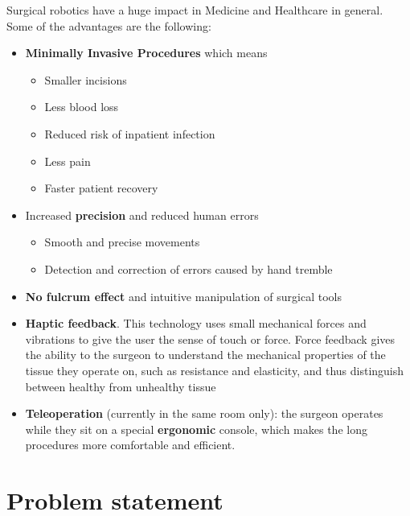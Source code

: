 Surgical robotics have a huge impact in Medicine and Healthcare in general. Some of the advantages are the following:
\begin{itemize}
\item \textbf{Minimally Invasive Procedures} which means
	\begin{itemize}
	\item Smaller incisions
	\item Less blood loss
	\item Reduced risk of inpatient infection
	\item Less pain
	\item Faster patient recovery
	\end{itemize}
\item Increased \textbf{precision} and reduced human errors
	\begin{itemize}
	\item Smooth and precise movements
	\item Detection and correction of errors caused by hand tremble
	\end{itemize}
\item \textbf{No fulcrum effect} and intuitive manipulation of surgical tools
\item \textbf{Haptic feedback}. This technology uses small mechanical forces and vibrations to give the user the sense of touch or force. Force feedback gives the ability to the surgeon to understand the 
mechanical properties of the tissue they operate on, such as resistance and elasticity, and thus distinguish between healthy from unhealthy tissue
\item \textbf{Teleoperation} (currently in the same room only): the surgeon operates while they sit on a special \textbf{ergonomic} console, which makes 
the long procedures more comfortable and efficient.
\end{itemize} 

\section{Problem statement}

